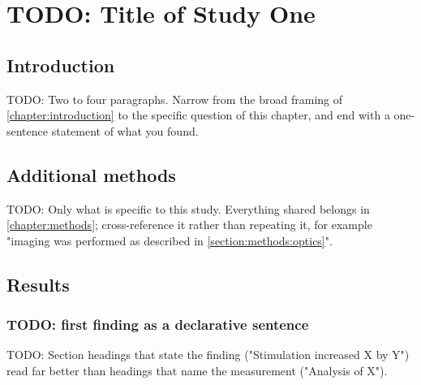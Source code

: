 \chapter{TODO: Title of Study One}\label{chapter:study-one}
\thispagestyle{myheadings}


	\section{Introduction}\label{section:study-one:introduction}

		TODO: Two to four paragraphs. Narrow from the broad framing of
		\cref{chapter:introduction} to the specific question of this chapter,
		and end with a one-sentence statement of what you found.

	\section{Additional methods}\label{section:study-one:methods}

		TODO: Only what is specific to this study. Everything shared belongs in
		\cref{chapter:methods}; cross-reference it rather than repeating it,
		for example "imaging was performed as described in
		\cref{section:methods:optics}".

	\section{Results}\label{section:study-one:results}

		\subsection{TODO: first finding as a declarative sentence}

			TODO: Section headings that state the finding ("Stimulation
			increased X by Y") read far better than headings that name the
			measurement ("Analysis of X").

